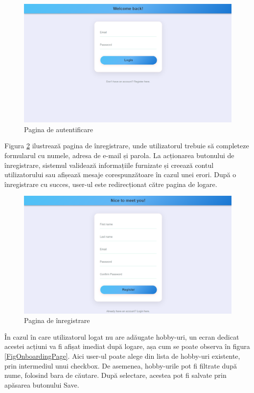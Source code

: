 \begin{figure}[htbp]
	\centering
    \includegraphics[scale=0.27]{./figures/login-page.png}
	\caption{Pagina de autentificare}
	\label{FigLoginPage}
\end{figure}

\par
Figura \ref{FigRegisterPage} ilustrează pagina de înregistrare, unde utilizatorul trebuie să completeze formularul cu numele, adresa de e-mail și parola.
La acționarea butonului de înregistrare, sistemul validează informațiile furnizate și creează contul utilizatorului sau afișează mesaje corespunzătoare în cazul unei erori.
După o înregistrare cu succes, user-ul este redirecționat către pagina de logare.

\begin{figure}[htbp]
	\centering
    \includegraphics[scale=0.32]{./figures/register-page.png}
	\caption{Pagina de înregistrare}
	\label{FigRegisterPage}
\end{figure}

\par
În cazul în care utilizatorul logat nu are adăugate hobby-uri, un ecran dedicat acestei acțiuni va fi afișat imediat după logare, așa cum se poate observa în figura \ref{FigOnboardingPage}.
Aici user-ul poate alege din lista de hobby-uri existente, prin intermediul unui checkbox. 
De asemenea, hobby-urile pot fi filtrate după nume, folosind bara de căutare.
După selectare, acestea pot fi salvate prin apăsarea butonului Save.

